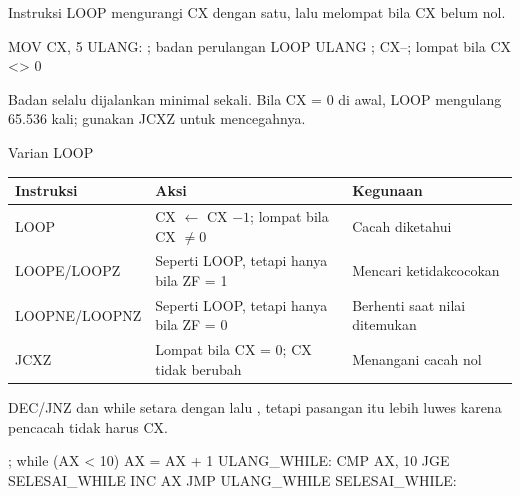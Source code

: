 \documentclass[aspectratio=169,11pt]{beamer}
\begin{document}

\begin{frame}[fragile]{Instruksi LOOP}
\small
{} mengurangi CX dengan satu, lalu melompat bila CX belum
nol.

\vspace{0.2em}
\begin{kodeasm}[numbers=none]
MOV CX, 5
ULANG:
    ; badan perulangan
    LOOP ULANG      ; CX--; lompat bila CX <> 0
\end{kodeasm}

\vspace{0.15em}
{\footnotesize\color{obeGray}Badan selalu dijalankan minimal sekali.
Bila CX = 0 di awal, LOOP mengulang 65.536 kali; gunakan JCXZ untuk
mencegahnya.\par}
\end{frame}

\begin{frame}{Varian LOOP}
\footnotesize
\begin{center}
\begin{tabular}{@{}>{\raggedright\arraybackslash}p{2.8cm}
    >{\raggedright\arraybackslash}p{5.0cm}
    >{\raggedright\arraybackslash}p{5.0cm}@{}}
    \toprule
    \textbf{Instruksi} & \textbf{Aksi} & \textbf{Kegunaan} \\
    \midrule
    LOOP & CX $\leftarrow$ CX $-1$; lompat bila CX $\neq0$ &
    Cacah diketahui \\
    \addlinespace
    LOOPE/LOOPZ & Seperti LOOP, tetapi hanya bila ZF = 1 &
    Mencari ketidakcocokan \\
    \addlinespace
    LOOPNE/LOOPNZ & Seperti LOOP, tetapi hanya bila ZF = 0 &
    Berhenti saat nilai ditemukan \\
    \addlinespace
    JCXZ & Lompat bila CX = 0; CX tidak berubah &
    Menangani cacah nol \\
    \bottomrule
\end{tabular}
\end{center}
\end{frame}

\begin{frame}[fragile]{DEC/JNZ dan while}
\small
{} setara dengan  lalu , tetapi
pasangan itu lebih luwes karena pencacah tidak harus CX.

\vspace{0.2em}
\begin{kodeasm}[numbers=none]
; while (AX < 10) { AX = AX + 1 }
ULANG_WHILE:
    CMP AX, 10
    JGE SELESAI_WHILE
    INC AX
    JMP ULANG_WHILE
SELESAI_WHILE:
\end{kodeasm}
\end{frame}
\end{document}

